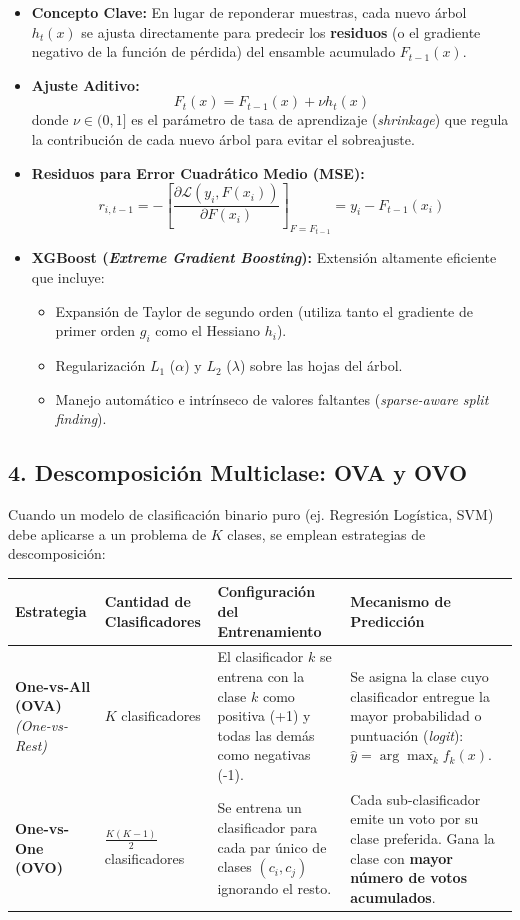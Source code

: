 \begin{itemize}
	\item \textbf{Concepto Clave:} En lugar de reponderar muestras, cada nuevo árbol $h_t(x)$ se ajusta directamente para predecir los \textbf{residuos} (o el gradiente negativo de la función de pérdida) del ensamble acumulado $F_{t-1}(x)$.
	
	\item \textbf{Ajuste Aditivo:}
	$$F_t(x) = F_{t-1}(x) + \nu h_t(x)$$
	donde $\nu \in (0, 1]$ es el parámetro de tasa de aprendizaje (\emph{shrinkage}) que regula la contribución de cada nuevo árbol para evitar el sobreajuste.
	
	\item \textbf{Residuos para Error Cuadrático Medio (MSE):}
	$$r_{i, t-1} = -\left[ \frac{\partial \mathcal{L}(y_i, F(x_i))}{\partial F(x_i)} \right]_{F = F_{t-1}} = y_i - F_{t-1}(x_i)$$
	
	\item \textbf{XGBoost (\emph{Extreme Gradient Boosting}):} Extensión altamente eficiente que incluye:
	\begin{itemize}
		\item Expansión de Taylor de segundo orden (utiliza tanto el gradiente de primer orden $g_i$ como el Hessiano $h_i$).
		\item Regularización $L_1$ ($\alpha$) y $L_2$ ($\lambda$) sobre las hojas del árbol.
		\item Manejo automático e intrínseco de valores faltantes (\emph{sparse-aware split finding}).
	\end{itemize}
\end{itemize}

\subsection{4. Descomposición Multiclase: OVA y OVO}

Cuando un modelo de clasificación binario puro (ej. Regresión Logística, SVM) debe aplicarse a un problema de $K$ clases, se emplean estrategias de descomposición:

\begin{table}[htbp]
	\centering
	\small
	\begin{tabular}{|p{3cm}|p{2.5cm}|p{3.5cm}|p{4.5cm}|}
		\hline
		\textbf{Estrategia} & \textbf{Cantidad de Clasificadores} & \textbf{Configuración del Entrenamiento} & \textbf{Mecanismo de Predicción} \\ \hline
		\textbf{One-vs-All (OVA)} \emph{(One-vs-Rest)} & $K$ clasificadores & El clasificador $k$ se entrena con la clase $k$ como positiva (+1) y todas las demás como negativas (-1). & Se asigna la clase cuyo clasificador entregue la mayor probabilidad o puntuación (\emph{logit}): $\hat{y} = \arg\max_{k} f_k(x)$. \\ \hline
		\textbf{One-vs-One (OVO)} & $\frac{K(K-1)}{2}$ clasificadores & Se entrena un clasificador para cada par único de clases $(c_i, c_j)$ ignorando el resto. & Cada sub-clasificador emite un voto por su clase preferida. Gana la clase con \textbf{mayor número de votos acumulados}. \\ \hline
	\end{tabular}
\end{table}

